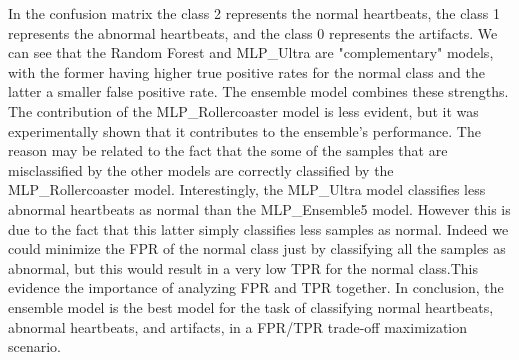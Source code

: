 \noindent
In the confusion matrix the class 2 represents the normal heartbeats, the class 1 represents the 
abnormal heartbeats, and the class 0 represents the artifacts. 
We can see that the Random Forest and MLP\_Ultra are "complementary" models, with the former 
having higher true positive rates for the normal class and the latter a smaller false positive rate.
The ensemble model combines these strengths. The contribution of the MLP\_Rollercoaster model is
less evident, but it was experimentally shown that it contributes to the ensemble's performance.
The reason may be related to the fact that the some of the samples that are misclassified by the
other models are correctly classified by the MLP\_Rollercoaster model.\newline
Interestingly, the MLP\_Ultra model classifies less abnormal heartbeats as normal than the MLP\_Ensemble5 model.
However this is due to the fact that this latter simply classifies less samples as normal. Indeed we could minimize the 
FPR of the normal class just by classifying all the samples as abnormal, but this would result in a
very low TPR for the normal class.This evidence the importance of analyzing FPR and TPR together.
In conclusion, the ensemble model is the best model for the task of classifying normal heartbeats,
abnormal heartbeats, and artifacts, in a FPR/TPR trade-off maximization scenario.